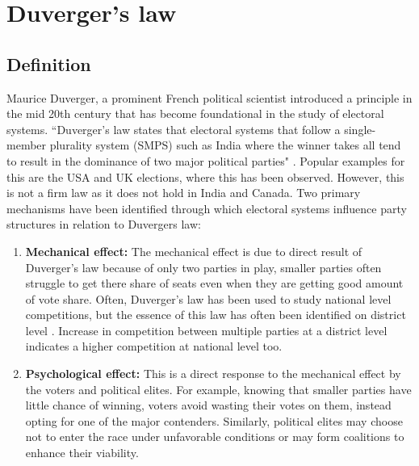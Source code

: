 \begin{sloppypar}
\section{Duverger's law}
\subsection{Definition}
Maurice Duverger, a prominent French political scientist introduced a principle in the mid 20th century that has  become foundational in the study of electoral systems. ``Duverger's law states that electoral systems that follow a single-member plurality system (SMPS) such as India where the winner takes all tend to result in the dominance of two major political parties" \citep{duverger1954political}. Popular examples for this are the USA and UK elections, where this has been observed. However, this is not a firm law as it does not hold in India and Canada.
Two primary mechanisms have been identified through which electoral systems influence party structures in relation to Duvergers law:
 \begin{enumerate}
     \item \textbf{Mechanical effect:}  The mechanical effect is due to direct result of Duverger's law  because of only two parties in play, smaller parties often struggle to get there share of seats even when they are getting good amount of vote share. Often, Duverger's law has been used to study national level competitions, but the essence of this law has often been identified on district level \citep{cox1997making,GALLAGHER199133,lijphart1994,rae1971political}. Increase in competition between multiple parties at a district level indicates a higher competition at national level too.
     \item \textbf{Psychological effect:} This is a direct response to the mechanical effect by the voters and political elites. For example, knowing that smaller parties have little chance of winning, voters avoid wasting their votes on them, instead opting for one of the major contenders. Similarly, political elites may choose not to enter the race under unfavorable conditions or may form coalitions to enhance their viability.
 \end{enumerate}

\end{sloppypar}
